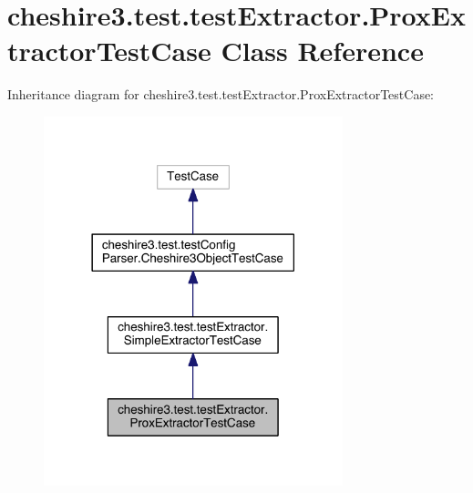 \hypertarget{classcheshire3_1_1test_1_1test_extractor_1_1_prox_extractor_test_case}{\section{cheshire3.\-test.\-test\-Extractor.\-Prox\-Extractor\-Test\-Case Class Reference}
\label{classcheshire3_1_1test_1_1test_extractor_1_1_prox_extractor_test_case}
}


Inheritance diagram for cheshire3.\-test.\-test\-Extractor.\-Prox\-Extractor\-Test\-Case\-:
\nopagebreak
\begin{figure}[H]
\begin{center}
\leavevmode
\includegraphics[width=246pt]{classcheshire3_1_1test_1_1test_extractor_1_1_prox_extractor_test_case__inherit__graph}
\end{center}
\end{figure}



